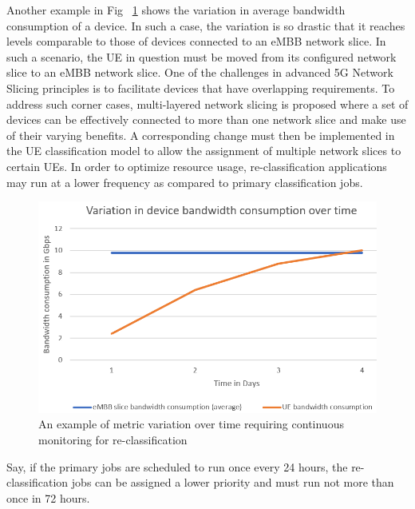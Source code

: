 \documentclass[conference]{IEEEtran}
\begin{document}
Another example in  Fig ~\ref{bwgraph} shows the variation in average bandwidth consumption of a device. In such a case, the variation is so drastic that it reaches levels comparable to those of devices connected to an eMBB network slice. In such a scenario, the UE in question must be moved from its configured network slice to an eMBB network slice. One of the challenges in advanced 5G Network Slicing principles is to facilitate devices that have overlapping requirements. To address such corner cases, multi-layered network slicing is proposed where a set of devices can be effectively connected to more than one network slice and make use of their varying benefits. 
A corresponding change must then be implemented in the UE classification model to allow the assignment of multiple network slices to certain UEs. In order to optimize resource usage, re-classification applications may run at a lower frequency as compared to primary classification jobs. 
\begin{figure}[ht]
\centerline{\includegraphics[scale=0.43]{fig4.png}}
\caption{An example of metric variation over time requiring continuous monitoring for re-classification}
\label{bwgraph}
\end{figure}
Say, if the primary jobs are scheduled to run once every 24 hours, the re-classification jobs can be assigned a lower priority and must run not more than once in 72 hours.
\end{document}
